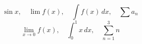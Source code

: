 \documentclass{article}
\begin{document}
\[
\sin x,\quad \lim f(x),\quad \int f(x)\,dx,\quad \sum a_n
\]
\[
\lim_{x\to 0}f(x),\quad \int_0^1 x\,dx,\quad \sum_{n=1}^{3}n
\]
\end{document}
